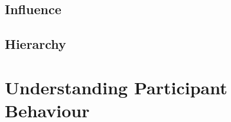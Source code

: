 \documentclass[twocolumn,10pt]{article}
\begin{document}
\subsection{Influence}



\subsection{Hierarchy}


\section{Understanding Participant Behaviour}



\end{document}
